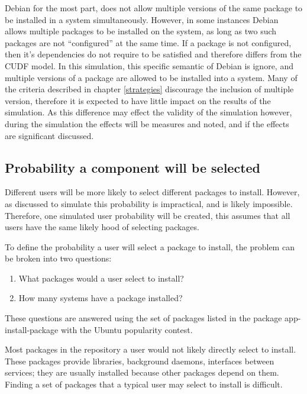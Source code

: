 Debian for the most part, does not allow multiple versions of the same package to be installed in a system simultaneously.
However, in some instances Debian allows multiple packages to be installed on the system, as long as two such packages are not ``configured'' at the same time.
If a package is not configured, then it's dependencies do not require to be satisfied and therefore differs from the CUDF model.
In this simulation, this specific semantic of Debian is ignore, and multiple versions of a package are allowed to be installed into a system.
Many of the criteria described in chapter \ref{strategies} discourage the inclusion of multiple version,
therefore it is expected to have little impact on the results of the simulation.
As this difference may effect the validity of the simulation however, during the simulation the effects will be measures and noted, and if the effects are significant discussed.


\subsection{Probability a component will be selected}
Different users will be more likely to select different packages to install.
However, as discussed to simulate this probability is impractical, and is likely impossible.
Therefore, one simulated user probability will be created, this assumes that all users have the same likely hood of selecting packages.

To define the probability a user will select a package to install, the problem can be broken into two questions:
\begin{enumerate}
  \item What packages would a user select to install?
  \item How many systems have a package installed?
\end{enumerate}
These questions are answered using the set of packages listed in the package app-install-package with the Ubuntu popularity contest.

Most packages in the repository a user would not likely directly select to install.
These packages provide libraries, background daemons, interfaces between services; they are usually installed because other packages depend on them.
Finding a set of packages that a typical user may select to install is difficult.

